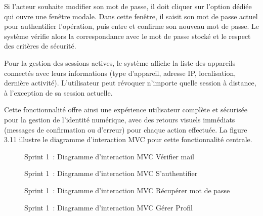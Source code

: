 \hspace{1em}Si l'acteur souhaite modifier son mot de passe, il doit cliquer sur l'option dédiée qui ouvre une fenêtre modale. Dans cette fenêtre, il saisit son mot de passe actuel pour authentifier l'opération, puis entre et confirme son nouveau mot de passe. Le système vérifie alors la correspondance avec le mot de passe stocké et le respect des critères de sécurité.

\hspace{1em}Pour la gestion des sessions actives, le système affiche la liste des appareils connectés avec leurs informations (type d'appareil, adresse IP, localisation, dernière activité). L'utilisateur peut révoquer n'importe quelle session à distance, à l'exception de sa session actuelle.

\hspace{1em}Cette fonctionnalité offre ainsi une expérience utilisateur complète et sécurisée pour la gestion de l'identité numérique, avec des retours visuels immédiats (messages de confirmation ou d'erreur) pour chaque action effectuée. La figure 3.11 illustre le diagramme d'interaction MVC pour cette fonctionnalité centrale.


\begin{figure}[H]
    \centering
    \caption{Sprint 1~: Diagramme d'interaction MVC \og Vérifier mail \fg{}}
    \label{fig:3.8}
\end{figure}

\begin{figure}[H]
    \centering
    \caption{Sprint 1~: Diagramme d'interaction MVC \og S'authentifier \fg{}}
    \label{fig:3.9}
\end{figure}

\begin{figure}[H]
    \centering
    \caption{Sprint 1~: Diagramme d'interaction MVC \og Récupérer mot de passe \fg{}}
    \label{fig:3.10}
\end{figure}

\begin{figure}[H]
    \centering
    \caption{Sprint 1~: Diagramme d'interaction MVC \og Gérer Profil \fg{}}
    \label{fig:3.11}
\end{figure}

